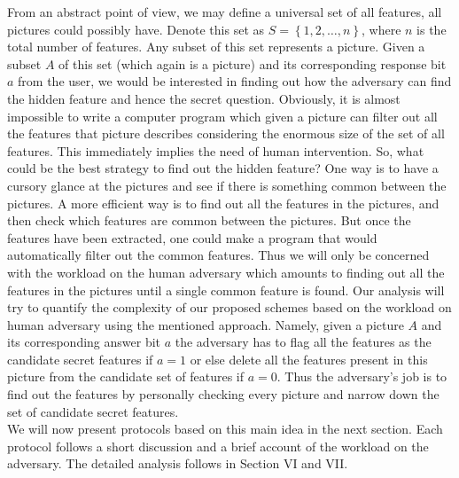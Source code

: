 \documentclass{llncs}
\begin{document}
From an abstract point of view, we may define a universal set of all features, all pictures could possibly have. Denote this set as $S = \left\{ {1,2, \ldots ,n} \right\}$, where $n$ is the total number of features. Any subset of this set represents a picture. Given a subset $A$ of this set (which again is a picture) and its corresponding response bit $a$ from the user, we would be interested in finding out how the adversary can find the hidden feature and hence the secret question. Obviously, it is almost impossible to write a computer program which given a picture can filter out all the features that picture describes considering the enormous size of the set of all features. This immediately implies the need of human intervention. So, what could be the best strategy to find out the hidden feature? One way is to have a cursory glance at the pictures and see if there is something common between the pictures. A more efficient way is to find out all the features in the pictures, and then check which features are common between the pictures. But once the features have been extracted, one could make a program that would automatically filter out the common features. Thus we will only be concerned with the workload on the human adversary which amounts to finding out all the features in the pictures until a single common feature is found. Our analysis will try to quantify the complexity of our proposed schemes based on the workload on human adversary using the mentioned approach. Namely, given a picture $A$ and its corresponding answer bit $a$ the adversary has to flag all the features as the candidate secret features if $a=1$ or else delete all the features present in this picture from the candidate set of features if $a=0$. Thus the adversary's job is to find out the features by personally checking every picture and narrow down the set of candidate secret features.\\
We will now present protocols based on this main idea in the next section. Each protocol follows a short discussion and a brief account of the workload on the adversary. The detailed analysis follows in Section VI and VII.
\end{document}
